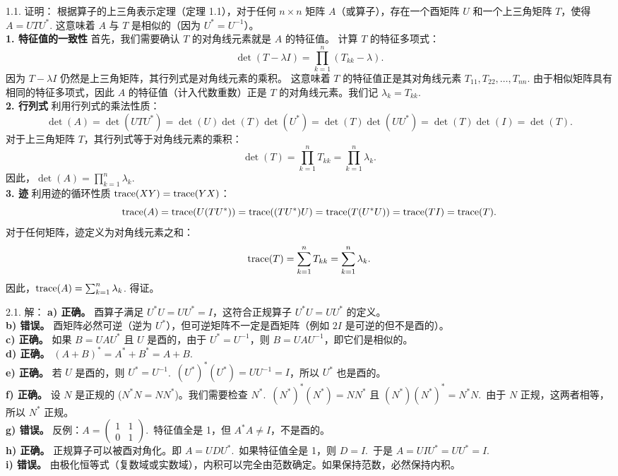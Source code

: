 \begin{exer}


1.1. 证明：
根据算子的上三角表示定理（定理 1.1），对于任何 $n \times n$ 矩阵 $A$（或算子），存在一个酉矩阵 $U$ 和一个上三角矩阵 $T$，使得 $A = U T U^*$.
这意味着 $A$ 与 $T$ 是相似的（因为 $U^* = U^{-1}$）。
\\
\textbf{1. 特征值的一致性}
首先，我们需要确认 $T$ 的对角线元素就是 $A$ 的特征值。
计算 $T$ 的特征多项式：
$$ \det(T - \lambda I) = \prod_{k=1}^n (T_{kk} - \lambda). $$
因为 $T - \lambda I$ 仍然是上三角矩阵，其行列式是对角线元素的乘积。
这意味着 $T$ 的特征值正是其对角线元素 $T_{11}, T_{22}, \dots, T_{nn}$.
由于相似矩阵具有相同的特征多项式，因此 $A$ 的特征值（计入代数重数）正是 $T$ 的对角线元素。我们记 $\lambda_k = T_{kk}$.
\\
\textbf{2. 行列式}
利用行列式的乘法性质：
$$ \det(A) = \det(U T U^*) = \det(U) \det(T) \det(U^*) = \det(T) \det(U U^*) = \det(T) \det(I) = \det(T). $$
对于上三角矩阵 $T$，其行列式等于对角线元素的乘积：
$$ \det(T) = \prod_{k=1}^n T_{kk} = \prod_{k=1}^n \lambda_k. $$
因此，$\det(A) = \prod_{k=1}^n \lambda_k$.
\\
\textbf{3. 迹}
利用迹的循环性质 $\operatorname{trace}(XY) = \operatorname{trace}(YX)$：
$$ \operatorname{trace}(A) = \operatorname{trace}(U (T U^*)) = \operatorname{trace}((T U^*) U) = \operatorname{trace}(T (U^* U)) = \operatorname{trace}(T I) = \operatorname{trace}(T). $$
对于任何矩阵，迹定义为对角线元素之和：
$$ \operatorname{trace}(T) = \sum_{k=1}^n T_{kk} = \sum_{k=1}^n \lambda_k. $$
因此，$\operatorname{trace}(A) = \sum_{k=1}^n \lambda_k$.
得证。


\vspace{5ex}

2.1. 解：
\textbf{a) 正确。} 酉算子满足 $U^*U = UU^* = I$，这符合正规算子 $U^*U = UU^*$ 的定义。\\
\textbf{b) 错误。} 酉矩阵必然可逆（逆为 $U^*$），但可逆矩阵不一定是酉矩阵（例如 $2I$ 是可逆的但不是酉的）。\\
\textbf{c) 正确。} 如果 $B = U A U^*$ 且 $U$ 是酉的，由于 $U^* = U^{-1}$，则 $B = U A U^{-1}$，即它们是相似的。\\
\textbf{d) 正确。} $(A+B)^* = A^* + B^* = A + B$.~\\
\textbf{e) 正确。} 若 $U$ 是酉的，则 $U^* = U^{-1}$.~$(U^*)^* (U^*) = U U^{-1} = I$，所以 $U^*$ 也是酉的。\\
\textbf{f) 正确。} 设 $N$ 是正规的 ($N^*N = NN^*$)。我们需要检查 $N^*$.~$(N^*)^* (N^*) = N N^*$ 且 $(N^*) (N^*)^* = N^* N$.~由于 $N$ 正规，这两者相等，所以 $N^*$ 正规。\\
\textbf{g) 错误。} 反例：$A = \begin{pmatrix} 1 & 1 \\ 0 & 1 \end{pmatrix}$.~特征值全是 1，但 $A^*A \neq I$，不是酉的。\\
\textbf{h) 正确。} 正规算子可以被酉对角化。即 $A = UDU^*$.~如果特征值全是 1，则 $D=I$.~于是 $A = UIU^* = UU^* = I$.~\\
\textbf{i) 错误。} 由极化恒等式（复数域或实数域），内积可以完全由范数确定。如果保持范数，必然保持内积。


\end{exer}
